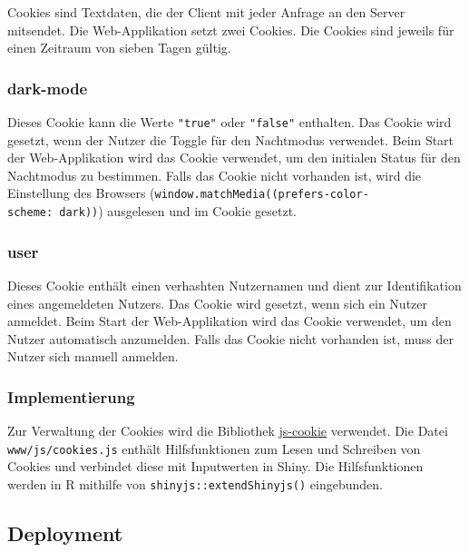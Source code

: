 \documentclass[
]{article}
\begin{document}
Cookies sind Textdaten, die der Client mit jeder Anfrage an den Server mitsendet. Die Web-Applikation setzt zwei Cookies. Die Cookies sind jeweils für einen Zeitraum von sieben Tagen gültig.

\hypertarget{dark-mode}{%
\subsubsection{dark-mode}\label{dark-mode}}

Dieses Cookie kann die Werte \texttt{"true"} oder \texttt{"false"} enthalten. Das Cookie wird gesetzt, wenn der Nutzer die Toggle für den Nachtmodus verwendet. Beim Start der Web-Applikation wird das Cookie verwendet, um den initialen Status für den Nachtmodus zu bestimmen. Falls das Cookie nicht vorhanden ist, wird die Einstellung des Browsers (\texttt{window.matchMedia(\textquotesingle{}(prefers-color-scheme:\ dark)\textquotesingle{})}) ausgelesen und im Cookie gesetzt.

\hypertarget{user-1}{%
\subsubsection{user}\label{user-1}}

Dieses Cookie enthält einen verhashten Nutzernamen und dient zur Identifikation eines angemeldeten Nutzers. Das Cookie wird gesetzt, wenn sich ein Nutzer anmeldet. Beim Start der Web-Applikation wird das Cookie verwendet, um den Nutzer automatisch anzumelden. Falls das Cookie nicht vorhanden ist, muss der Nutzer sich manuell anmelden.

\hypertarget{implementierung}{%
\subsubsection{Implementierung}\label{implementierung}}

Zur Verwaltung der Cookies wird die Bibliothek \href{https://github.com/js-cookie/js-cookie}{js-cookie} verwendet. Die Datei \texttt{www/js/cookies.js} enthält Hilfsfunktionen zum Lesen und Schreiben von Cookies und verbindet diese mit Inputwerten in Shiny. Die Hilfsfunktionen werden in R mithilfe von \texttt{shinyjs::extendShinyjs()} eingebunden.

\hypertarget{deployment-1}{%
\subsection{Deployment}\label{deployment-1}}
\end{document}
